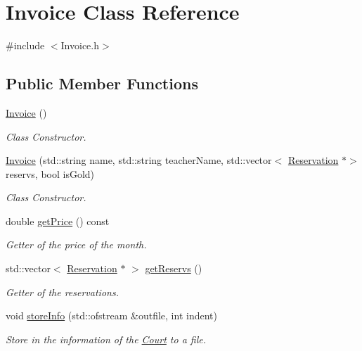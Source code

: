 \hypertarget{class_invoice}{}\section{Invoice Class Reference}
\label{class_invoice}


{\ttfamily \#include $<$Invoice.\+h$>$}

\subsection*{Public Member Functions}
\begin{DoxyCompactItemize}
\item 
\mbox{\label{class_invoice_a25d6ad261479340ac3775e21f03eef90}} 
\mbox{\hyperlink{class_invoice_a25d6ad261479340ac3775e21f03eef90}{Invoice}} ()
\begin{DoxyCompactList}\small\item\em Class Constructor. \end{DoxyCompactList}\item 
\mbox{\hyperlink{class_invoice_a6db408ae47f1a40911c51b769b428034}{Invoice}} (std\+::string name, std\+::string teacher\+Name, std\+::vector$<$ \mbox{\hyperlink{class_reservation}{Reservation}} $\ast$$>$ reservs, bool is\+Gold)
\begin{DoxyCompactList}\small\item\em Class Constructor. \end{DoxyCompactList}\item 
double \mbox{\hyperlink{class_invoice_a049d93832eedd6c40a0b5a686771bdb6}{get\+Price}} () const
\begin{DoxyCompactList}\small\item\em Getter of the price of the month. \end{DoxyCompactList}\item 
std\+::vector$<$ \mbox{\hyperlink{class_reservation}{Reservation}} $\ast$ $>$ \mbox{\hyperlink{class_invoice_a98ede540a39d22c91a3bc6c5b28116fd}{get\+Reservs}} ()
\begin{DoxyCompactList}\small\item\em Getter of the reservations. \end{DoxyCompactList}\item 
void \mbox{\hyperlink{class_invoice_a326f9548d517f1f432939e0c8231a84e}{store\+Info}} (std\+::ofstream \&outfile, int indent)
\begin{DoxyCompactList}\small\item\em Store in the information of the \mbox{\hyperlink{class_court}{Court}} to a file. \end{DoxyCompactList}\item 
$$
\end{DoxyCompactItemize}
